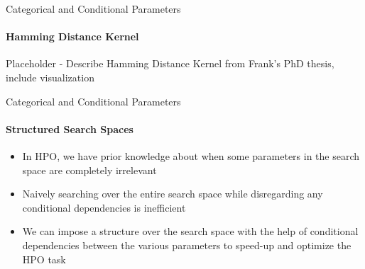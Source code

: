 \begin{frame}[c]{Categorical and Conditional Parameters}
\framesubtitle{Hamming Distance Kernel}
\begin{center}
Placeholder - Describe Hamming Distance Kernel from Frank's PhD thesis, include visualization
\end{center}
\end{frame}
\begin{frame}[c]{Categorical and Conditional Parameters}
\framesubtitle{Structured Search Spaces}
\begin{itemize}
    \item<+-> In HPO, we have prior knowledge about when some parameters in the search space are completely irrelevant
    \item<+-> Naively searching over the entire search space while disregarding any conditional dependencies is inefficient
    \item<+-> We can impose a structure over the search space with the help of conditional dependencies between the various parameters to speed-up and optimize the HPO task
\end{itemize}
\end{frame}
